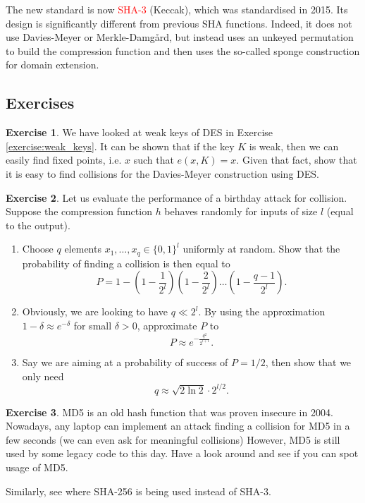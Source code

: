\documentclass[a4paper, 11pt, openany]{book}
\numberwithin{equation}{section}
\theoremstyle{plain}
\theoremstyle{definition}
\newtheorem{exercise}   {Exercise}  [section]
\newcommand{\Important}[1]{\textcolor{red}{#1}}
\begin{document}
The new standard is now \Important{SHA-3} (Keccak), which was standardised in 2015. Its design is significantly different from previous SHA functions. Indeed, it does not use Davies-Meyer or Merkle-Damg\aa{}rd, but instead uses an unkeyed permutation to build the compression function and then uses the so-called sponge construction for domain extension.



\subsection{Exercises}

\begin{exercise}
We have looked at weak keys of DES in Exercise \ref{exercise:weak_keys}. It can be shown that if the key $K$ is weak, then we can easily find fixed points, i.e. $x$ such that $e(x,K) = x$. Given that fact, show that it is easy to find collisions for the Davies-Meyer construction using DES.
\end{exercise}


\begin{exercise}
Let us evaluate the performance of a birthday attack for collision. Suppose the compression function $h$ behaves randomly for inputs of size $l$ (equal to the output). 
\begin{enumerate}
\item Choose $q$ elements $x_1, \dots, x_q \in \{0,1\}^l$ uniformly at random. Show that the probability of finding a collision is then equal to
\[
    P = 1 - \left( 1 - \frac{1}{2^l} \right) \left( 1 - \frac{2}{2^l} \right) \dots \left( 1 - \frac{q-1}{2^l} \right).
\]

\item Obviously, we are looking to have $q \ll 2^l$. By using the approximation $1 - \delta \approx e^{-\delta}$ for small $\delta > 0$, approximate $P$ to
\[
    P \approx e^{- \frac{ q^2 }{ 2^{l+1} } }.
\]

\item Say we are aiming at a probability of success of $P  = 1/2$, then show that we only need
\[
    q \approx \sqrt{2 \ln 2} \cdot 2^{l/2}.
\]
\end{enumerate}
\end{exercise}




\begin{exercise}
MD5 is an old hash function that was proven insecure in 2004. Nowadays, any laptop can implement an attack finding a collision for MD5 in a few seconds (we can even ask for meaningful collisions) However, MD5 is still used by some legacy code to this day. Have a look around and see if you can spot usage of MD5.

Similarly, see where SHA-256 is being used instead of SHA-3.
\end{exercise}
\end{document}
